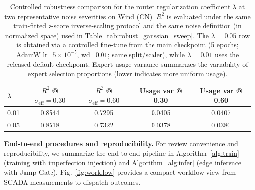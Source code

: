 \documentclass[review,3p,times]{elsarticle}
\begin{document}
\begin{table}[t]
\centering
\caption{Controlled robustness comparison for the router regularization coefficient $\lambda$ at two representative noise severities on Wind (CN). $R^2$ is evaluated under the same train-fitted z-score inverse-scaling protocol and the same noise definition (in normalized space) used in Table~\ref{tab:robust_gaussian_sweep}. The $\lambda=0.05$ row is obtained via a controlled fine-tune from the main checkpoint (5 epochs; AdamW lr=$5\times10^{-5}$, wd=$0.01$; same split/scaler), while $\lambda=0.01$ uses the released default checkpoint. Expert usage variance summarizes the variability of expert selection proportions (lower indicates more uniform usage).}
\label{tab:lambda_robust_compare}
\begin{tabular}{lcccc}
\toprule
$\lambda$ & $R^2$ @ $\sigma_{\mathrm{eff}}=0.30$ & $R^2$ @ $\sigma_{\mathrm{eff}}=0.60$ & Usage var @ 0.30 & Usage var @ 0.60 \\
\midrule
0.01 & 0.8544 & 0.7295 & 0.0405 & 0.0407 \\
0.05 & 0.8518 & 0.7322 & 0.0378 & 0.0380 \\
\bottomrule
\end{tabular}
\end{table}


\noindent\textbf{End-to-end procedures and reproducibility.}\label{sec:algo_summary}
For review convenience and reproducibility, we summarize the end-to-end pipeline in Algorithm~\ref{alg:train} (training with imperfection injection) and Algorithm~\ref{alg:infer} (edge inference with Jump Gate). Fig.~\ref{fig:workflow} provides a compact workflow view from SCADA measurements to dispatch outcomes.
\end{document}
